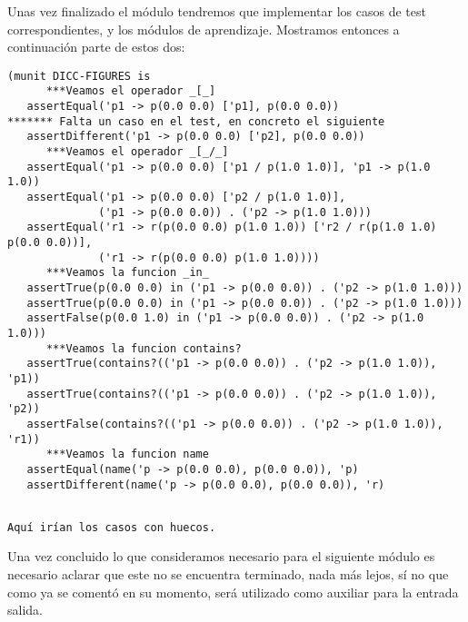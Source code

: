 Unas vez finalizado el módulo tendremos que implementar los casos de test correspondientes, y los módulos de aprendizaje. Mostramos entonces a continuación parte de estos dos: \par

{\codesize
\begin{verbatim}
(munit DICC-FIGURES is
      ***Veamos el operador _[_]
   assertEqual('p1 -> p(0.0 0.0) ['p1], p(0.0 0.0))
******* Falta un caso en el test, en concreto el siguiente
   assertDifferent('p1 -> p(0.0 0.0) ['p2], p(0.0 0.0))
      ***Veamos el operador _[_/_]
   assertEqual('p1 -> p(0.0 0.0) ['p1 / p(1.0 1.0)], 'p1 -> p(1.0 1.0))
   assertEqual('p1 -> p(0.0 0.0) ['p2 / p(1.0 1.0)], 
              ('p1 -> p(0.0 0.0)) . ('p2 -> p(1.0 1.0)))
   assertEqual('r1 -> r(p(0.0 0.0) p(1.0 1.0)) ['r2 / r(p(1.0 1.0) p(0.0 0.0))], 
              ('r1 -> r(p(0.0 0.0) p(1.0 1.0))))
      ***Veamos la funcion _in_
   assertTrue(p(0.0 0.0) in ('p1 -> p(0.0 0.0)) . ('p2 -> p(1.0 1.0)))
   assertTrue(p(0.0 0.0) in ('p1 -> p(0.0 0.0)) . ('p2 -> p(1.0 1.0)))
   assertFalse(p(0.0 1.0) in ('p1 -> p(0.0 0.0)) . ('p2 -> p(1.0 1.0)))
      ***Veamos la funcion contains?
   assertTrue(contains?(('p1 -> p(0.0 0.0)) . ('p2 -> p(1.0 1.0)), 'p1))
   assertTrue(contains?(('p1 -> p(0.0 0.0)) . ('p2 -> p(1.0 1.0)), 'p2))
   assertFalse(contains?(('p1 -> p(0.0 0.0)) . ('p2 -> p(1.0 1.0)), 'r1))
      ***Veamos la funcion name
   assertEqual(name('p -> p(0.0 0.0), p(0.0 0.0)), 'p)
   assertDifferent(name('p -> p(0.0 0.0), p(0.0 0.0)), 'r)
\end{verbatim}
}

{\codesize
\begin{verbatim}

Aquí irían los casos con huecos.

\end{verbatim}
}

Una vez concluido lo que consideramos necesario para el siguiente módulo es necesario aclarar que este no se encuentra terminado, nada más lejos, sí no que como ya se comentó en su momento, será utilizado como auxiliar para la entrada salida.
